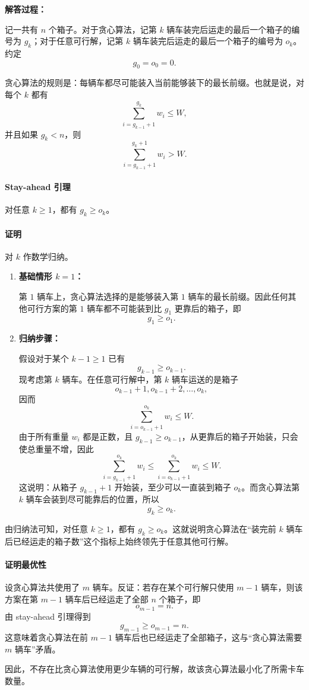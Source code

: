 \documentclass[12pt,a4paper]{article}
\begin{document}
\begin{answerbox}
\textbf{解答过程：}

记一共有 $n$ 个箱子。对于贪心算法，记第 $k$ 辆车装完后运走的最后一个箱子的编号为 $g_k$；对于任意可行解，记第 $k$ 辆车装完后运走的最后一个箱子的编号为 $o_k$。约定
\[
g_0=o_0=0.
\]

贪心算法的规则是：每辆车都尽可能装入当前能够装下的最长前缀。也就是说，对每个 $k$ 都有
\[
\sum_{i=g_{k-1}+1}^{g_k} w_i \le W,
\]
并且如果 $g_k<n$，则
\[
\sum_{i=g_{k-1}+1}^{g_k+1} w_i > W.
\]

\paragraph{Stay-ahead 引理}
对任意 $k\ge 1$，都有 $g_k \ge o_k$。

\paragraph{证明}
对 $k$ 作数学归纳。

\begin{enumerate}[leftmargin=2.5em]
    \item \textbf{基础情形 $k=1$：}

    第 $1$ 辆车上，贪心算法选择的是能够装入第 $1$ 辆车的最长前缀。因此任何其他可行方案的第 $1$ 辆车都不可能装到比 $g_1$ 更靠后的箱子，即
    \[
    g_1 \ge o_1.
    \]

    \item \textbf{归纳步骤：}

    假设对于某个 $k-1\ge 1$ 已有
    \[
    g_{k-1} \ge o_{k-1}.
    \]
    现考虑第 $k$ 辆车。在任意可行解中，第 $k$ 辆车运送的是箱子
    \[
    o_{k-1}+1,o_{k-1}+2,\dots,o_k,
    \]
    因而
    \[
    \sum_{i=o_{k-1}+1}^{o_k} w_i \le W.
    \]
    由于所有重量 $w_i$ 都是正数，且 $g_{k-1}\ge o_{k-1}$，从更靠后的箱子开始装，只会使总重量不增，因此
    \[
    \sum_{i=g_{k-1}+1}^{o_k} w_i \le \sum_{i=o_{k-1}+1}^{o_k} w_i \le W.
    \]
    这说明：从箱子 $g_{k-1}+1$ 开始装，至少可以一直装到箱子 $o_k$。而贪心算法第 $k$ 辆车会装到尽可能靠后的位置，所以
    \[
    g_k \ge o_k.
    \]
\end{enumerate}

由归纳法可知，对任意 $k\ge 1$，都有 $g_k \ge o_k$。这就说明贪心算法在“装完前 $k$ 辆车后已经运走的箱子数”这个指标上始终领先于任意其他可行解。

\paragraph{证明最优性}
设贪心算法共使用了 $m$ 辆车。反证：若存在某个可行解只使用 $m-1$ 辆车，则该方案在第 $m-1$ 辆车后已经运走了全部 $n$ 个箱子，即
\[
o_{m-1}=n.
\]
由 stay-ahead 引理得到
\[
g_{m-1}\ge o_{m-1}=n.
\]
这意味着贪心算法在前 $m-1$ 辆车后也已经运走了全部箱子，这与“贪心算法需要 $m$ 辆车”矛盾。

因此，不存在比贪心算法使用更少车辆的可行解，故该贪心算法最小化了所需卡车数量。
\end{answerbox}
\end{document}
